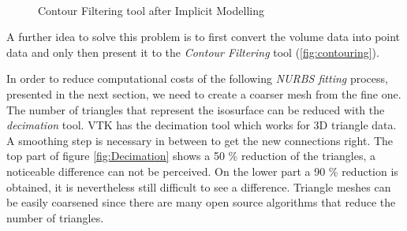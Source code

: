 \begin{figure}
\centering
   \\
   \caption{Contour Filtering tool after Implicit Modelling}
   \label{fig:contouring}
\end{figure}

A further idea to solve this problem is to first convert the volume data into point data
and only then present it to the \textit{Contour Filtering} tool (\autoref{fig:contouring}).

In order to reduce computational costs of the following \textit{NURBS fitting} process, presented in the next section, we need to create a coarser mesh from the fine one. The number of triangles that represent the
isosurface can be reduced with the \textit{decimation} tool.  VTK has the
decimation tool which works for 3D triangle data. A smoothing step is necessary in between
to get the new connections right. The top part of figure \ref{fig:Decimation} shows a 50 \% reduction of the
triangles, a noticeable difference can not be perceived. On the lower part a 90 \% reduction is
obtained, it is nevertheless still difficult to see a difference. Triangle meshes can be easily
coarsened since there are many open source algorithms that reduce the number of triangles.

